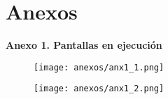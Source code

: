\documentclass[12pt,letterpaper]{article}
\begin{document}
\section{Anexos}
\textbf{Anexo 1. Pantallas en ejecución}

\begin{figure}[H]
    \centering
    \texttt{[image: anexos/anx1\_1.png]}
\end{figure}

\begin{figure}[H]
    \centering
    \texttt{[image: anexos/anx1\_2.png]}
\end{figure}
\end{document}
